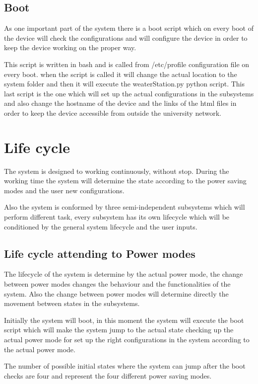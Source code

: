 	\section{Boot} %
	As one important part of the system there is a boot script which on every boot of the device will check the configurations and will configure the device in order to keep the device working on the proper way.

	This script is written in bash and is called from /etc/profile configuration file on every boot. when the script is called it will change the actual location to the system folder and then it will execute the weaterStation.py python script. This last script is the one which will set up the actual configurations in the subsystems and also change the hostname of the device and the links of the html files in order to keep the device accessible from outside the university network.

\chapter{Life cycle} %
	The system is designed to working continuously, without stop. During the working time the system will determine the state according to the power saving modes and the user new configurations.

	Also the system is conformed by three semi-independent subsystems which will perform different task, every subsystem has its own lifecycle which will be conditioned by the general system lifecycle and the user inputs.

	\section{Life cycle attending to Power modes}
		The lifecycle of the system is determine by the actual power mode, the change between power modes changes the behaviour and the functionalities of the system. Also the change between power modes will determine directly the movement between states in the subsystems.

		Initially the system will boot, in this moment the system will execute the boot script which will make the system jump to the actual state checking up the actual power mode for set up the right configurations in the system according to the actual power mode.

		The number of possible initial states where the system can jump after the boot checks are four and represent the four different power saving modes.

